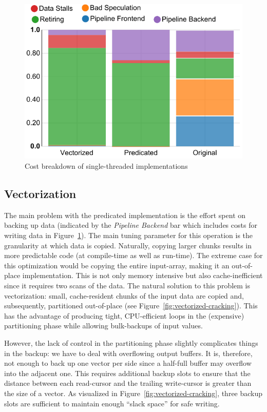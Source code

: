 \begin{figure}
  \centering
  \includegraphics[width=.85\columnwidth]{Figures/damon/CostBreakdownEfficient}
  \caption{Cost breakdown of single-threaded implementations}
\vspace{-2.5ex}
  \label{fig:breakdown-efficient}
\end{figure}
\subsection*{Vectorization}
\label{sec:vectorization}
The main problem with the predicated implementation is the effort
spent on backing up data (indicated by the \emph{Pipeline Backend} bar
which includes costs for writing data in
Figure~\ref{fig:breakdown-efficient}).  The main tuning parameter for
this operation is the granularity at which data is copied. Naturally,
copying larger chunks results in more predictable code (at
compile-time as well as run-time). The extreme case for this
optimization would be copying the entire input-array, making it an
out-of-place implementation. This is not only memory intensive but
also cache-inefficient since it requires two scans of the data. The
natural solution to this problem is vectorization: small,
cache-resident chunks of the input data are copied and, subsequently,
partitioned out-of-place (see
Figure~\ref{fig:vectorized-cracking}). This has the advantage of
producing tight, CPU-efficient loops in the (expensive) partitioning
phase while allowing bulk-backups of input values.

However, the lack of control in the partitioning phase slightly
complicates things in the backup: we have to deal with overflowing
output buffers. It is, therefore, not enough to back up one vector per
side since a half-full buffer may overflow into the adjacent one. This
requires additional backup slots to ensure that the distance between
each read-cursor and the trailing write-cursor is greater than the
size of a vector. As visualized in
Figure~\ref{fig:vectorized-cracking}, three backup slots are
sufficient to maintain enough ``slack space'' for safe writing.

